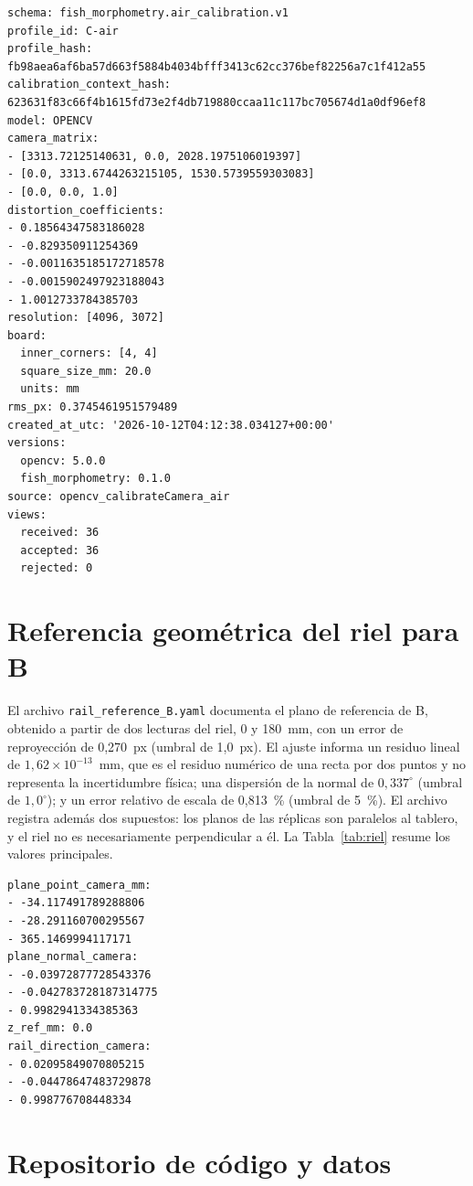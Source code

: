 \begin{lstlisting}[caption={Cabecera y resumen del perfil C en aire.},label={lst:calC}]
schema: fish_morphometry.air_calibration.v1
profile_id: C-air
profile_hash: fb98aea6af6ba57d663f5884b4034bfff3413c62cc376bef82256a7c1f412a55
calibration_context_hash: 623631f83c66f4b1615fd73e2f4db719880ccaa11c117bc705674d1a0df96ef8
model: OPENCV
camera_matrix:
- [3313.72125140631, 0.0, 2028.1975106019397]
- [0.0, 3313.6744263215105, 1530.5739559303083]
- [0.0, 0.0, 1.0]
distortion_coefficients:
- 0.18564347583186028
- -0.829350911254369
- -0.0011635185172718578
- -0.0015902497923188043
- 1.0012733784385703
resolution: [4096, 3072]
board:
  inner_corners: [4, 4]
  square_size_mm: 20.0
  units: mm
rms_px: 0.3745461951579489
created_at_utc: '2026-10-12T04:12:38.034127+00:00'
versions:
  opencv: 5.0.0
  fish_morphometry: 0.1.0
source: opencv_calibrateCamera_air
views:
  received: 36
  accepted: 36
  rejected: 0
\end{lstlisting}

\chapter{Referencia geométrica del riel para B}
\label{anx:riel}

El archivo \texttt{rail\_reference\_B.yaml} documenta el plano de referencia de B, obtenido a partir de dos lecturas del riel, 0 y 180~mm, con un error de reproyección de 0,270~px (umbral de 1,0~px). El ajuste informa un residuo lineal de $1{,}62 \times 10^{-13}$~mm, que es el residuo numérico de una recta por dos puntos y no representa la incertidumbre física; una dispersión de la normal de $0{,}337^{\circ}$ (umbral de $1{,}0^{\circ}$); y un error relativo de escala de 0,813~\% (umbral de 5~\%). El archivo registra además dos supuestos: los planos de las réplicas son paralelos al tablero, y el riel no es necesariamente perpendicular a él. La Tabla~\ref{tab:riel} resume los valores principales.

\begin{lstlisting}[caption={Cabecera y plano de referencia del riel para B.},label={lst:riel}]
plane_point_camera_mm:
- -34.117491789288806
- -28.291160700295567
- 365.1469994117171
plane_normal_camera:
- -0.03972877728543376
- -0.042783728187314775
- 0.9982941334385363
z_ref_mm: 0.0
rail_direction_camera:
- 0.02095849070805215
- -0.04478647483729878
- 0.998776708448334
\end{lstlisting}

\chapter{Repositorio de código y datos}
\label{anx:repositorio}

